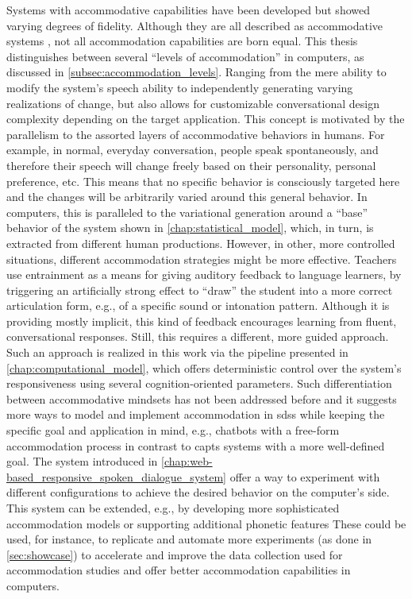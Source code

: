 Systems with accommodative capabilities have been developed but showed varying degrees of fidelity.
Although they are all described as accommodative systems \citep[like the one introduced by][]{Levitan2016implementing}, not all accommodation capabilities are born equal.
This thesis distinguishes between several \enquote{levels of accommodation} in computers, as discussed in \cref{subsec:accommodation_levels}.
Ranging from the mere ability to modify the system's speech ability to independently generating varying realizations of change, but also allows for customizable conversational design complexity depending on the target application.
This concept is motivated by the parallelism to the assorted layers of accommodative behaviors in humans.
For example, in normal, everyday conversation, people speak spontaneously, and therefore their speech will change freely based on their personality, personal preference, etc.
This means that no specific behavior is consciously targeted here and the changes will be arbitrarily varied around this general behavior.
In computers, this is paralleled to the variational generation around a \enquote{base} behavior of the system shown in \cref{chap:statistical_model}, which, in turn, is extracted from different human productions.
However, in other, more controlled situations, different accommodation strategies might be more effective.
Teachers use entrainment as a means for giving auditory feedback to language learners, by triggering an artificially strong effect to \enquote{draw} the student into a more correct articulation form, e.g., of a specific sound or intonation pattern.
Although it is providing mostly implicit, this kind of feedback encourages learning from fluent, conversational responses.
Still, this requires a different, more guided approach.
Such an approach is realized in this work via the pipeline presented in \cref{chap:computational_model}, which offers deterministic control over the system's responsiveness using several cognition-oriented parameters.
Such differentiation between accommodative mindsets has not been addressed before and it suggests more ways to model and implement accommodation in \acp{sds} while keeping the specific goal and application in mind, e.g., chatbots with a free-form accommodation process in contrast to \acp{capt} systems with a more well-defined goal.
The system introduced in \cref{chap:web-based_responsive_spoken_dialogue_system} offer a way to experiment with different configurations to achieve the desired behavior on the computer's side.
This system can be extended, e.g., by developing more sophisticated accommodation models or supporting additional phonetic features
These could be used, for instance, to replicate and automate more experiments (as done in \cref{sec:showcase}) to accelerate and improve the data collection used for accommodation studies and offer better accommodation capabilities in computers.

